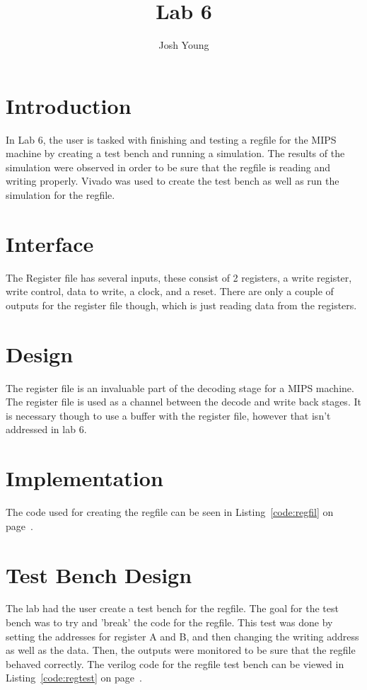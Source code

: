 \documentclass{article}
\author{Josh Young}
\title{Lab 6}
\newcommand{\Verilog}[3]{
  \lstset{language=Verilog}
  \lstset{backgroundcolor=\color{listinggray},rulecolor=\color{blue}}
  \lstset{linewidth=\textwidth}
  \lstset{commentstyle=\textit, stringstyle=\upshape,showspaces=false}
  \lstset{frame=tb}
  
}
\begin{document}
\maketitle

\section{Introduction}
In Lab 6, the user is tasked with finishing and testing a regfile for the MIPS machine by creating a test bench and running a simulation. The results of the simulation were observed in order to be sure that the regfile is reading and writing properly. Vivado was used to create the test bench as well as run the simulation for the regfile.

\section{Interface}
The Register file has several inputs, these consist of 2 registers, a write register, write control, data to write, a clock, and a reset. There are only a couple of outputs for the register file though, which is just reading data from the registers.

\section{Design}
The register file is an invaluable part of the decoding stage for a MIPS machine. The register file is used as a channel between the decode and write back stages. It is necessary though to use a buffer with the register file, however that isn't addressed in lab 6.

\section{Implementation}
The code used for creating the regfile can be seen in Listing~\ref{code:regfil} on page~\pageref{code:regfil}.

\Verilog{Verilog code for implementing a regfile.}{code:regfil}{../code/2_decode/regfile.v}

\section{Test Bench Design}
The lab had the user create a test bench for the regfile. The goal for the test bench was to try and 'break' the code for the regfile. This test was done by setting the addresses for register A and B, and then changing the writing address as well as the data. Then, the outputs were monitored to be sure that the regfile behaved correctly. The verilog code for the regfile test bench can be viewed in Listing~\ref{code:regtest} on page~\pageref{code:regtest}. 
\end{document}
